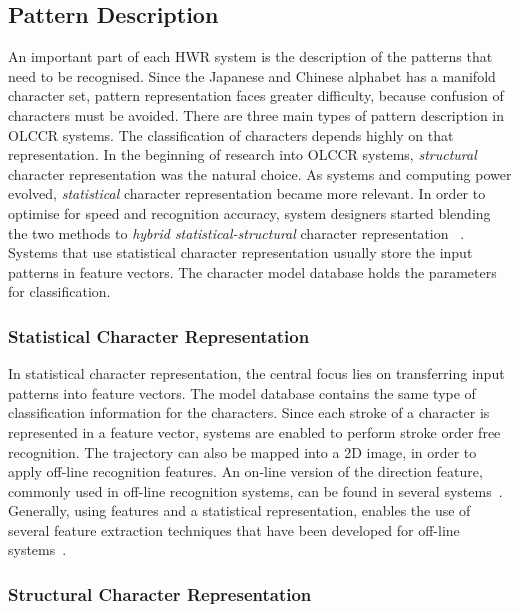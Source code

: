 \subsection{Pattern Description}
\label{sec:olccr:patterndescription}

An important part of each HWR system is the description of the patterns that
need to be recognised. Since the Japanese and Chinese alphabet has a manifold 
character set, pattern representation faces greater difficulty, because confusion
of characters must be avoided.
There are three main types of pattern description in OLCCR systems. The 
classification of characters depends highly on that representation.
In the beginning of research into OLCCR systems, \emph{structural} character 
representation was the natural choice. As systems and computing power evolved, 
\emph{statistical} character representation became more relevant. In order to 
optimise for speed and recognition accuracy, system designers started blending
the two methods to \emph{hybrid statistical-structural} character representation
~. Systems that use statistical character
representation usually store the input patterns in feature vectors. The character
model database holds the parameters for classification.

\subsubsection{Statistical Character Representation} 
\label{sec:olccr:statisticalrepresentation}

In statistical character representation, the central focus lies on transferring
input patterns into feature vectors. The model database contains the same type
of classification information for the characters.
Since each stroke of a character is represented in a feature vector, 
systems are enabled to perform stroke order free recognition. The trajectory
can also be mapped into a 2D image, in order to apply off-line recognition 
features. An on-line version of the direction feature, commonly used in off-line recognition systems, can be found in several systems~. 
Generally, using features and a statistical representation, 
enables the use of several feature extraction techniques that have been 
developed for off-line systems~.

\subsubsection{Structural Character Representation}
\label{sec:olccr:structuralcharacterrepresentation}

